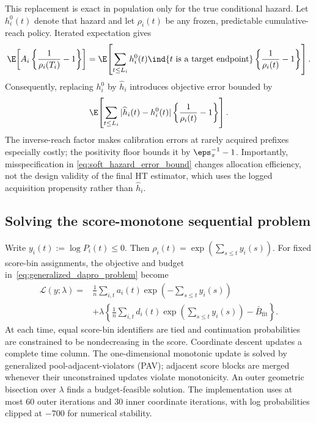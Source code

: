 This replacement is exact in population only for the true conditional
hazard.  Let $h_i^0(t)$ denote that hazard and let $\rho_i(t)$ be any frozen,
predictable cumulative-reach policy.  Iterated expectation gives
\begin{equation}
\begin{split}
    \E\!\left[
      A_i\left\{\frac{1}{\rho_i(T_i)}-1\right\}
    \right]
    =\E\!\left[
      \sum_{t\leq L_i}h_i^0(t)\ind{t\ \text{is a target endpoint}}
      \left\{\frac{1}{\rho_i(t)}-1\right\}
    \right].
    \label{eq:soft_hazard_exact_identity}
\end{split}
\end{equation}
Consequently, replacing $h_i^0$ by $\widehat h_i$ introduces objective error
bounded by
\begin{equation}
    \E\!\left[
      \sum_{t\leq L_i}
      |\widehat h_i(t)-h_i^0(t)|
      \left\{\frac{1}{\rho_i(t)}-1\right\}
    \right].
    \label{eq:soft_hazard_error_bound}
\end{equation}
The inverse-reach factor makes calibration errors at rarely acquired prefixes
especially costly; the positivity floor bounds it by
$\eps_\pi^{-1}-1$.  Importantly, misspecification in
\eqref{eq:soft_hazard_error_bound} changes allocation efficiency, not the
design validity of the final HT estimator, which uses the logged acquisition
propensity rather than $\widehat h_i$.

\subsection{Solving the score-monotone sequential problem}

Write $y_i(t):=\log P_i(t)\leq0$.  Then
$\rho_i(t)=\exp(\sum_{s\leq t}y_i(s))$.  For fixed score-bin assignments, the
objective and budget in~\eqref{eq:generalized_dapro_problem} become
\begin{equation}
\begin{split}
    \mathcal{L}(y;\lambda)
    ={}&\frac{1}{n}\sum_{i,t}a_i(t)
      \exp\!\left(-\sum_{s\leq t}y_i(s)\right)\\
    &+\lambda\left\{
      \frac{1}{n}\sum_{i,t}d_i(t)
      \exp\!\left(\sum_{s\leq t}y_i(s)\right)
      -\bar B_{\mathrm{fit}}
    \right\}.
    \label{eq:dapro_log_lagrangian}
\end{split}
\end{equation}
At each time, equal score-bin identifiers are tied and continuation
probabilities are constrained to be nondecreasing in the score.  Coordinate
descent updates a complete time column.  The one-dimensional monotonic update
is solved by generalized pool-adjacent-violators (PAV); adjacent score blocks
are merged whenever their unconstrained updates violate monotonicity.  An
outer geometric bisection over $\lambda$ finds a budget-feasible solution.
The implementation uses at most $60$ outer iterations and $30$ inner
coordinate iterations, with log probabilities clipped at $-700$ for numerical
stability.

